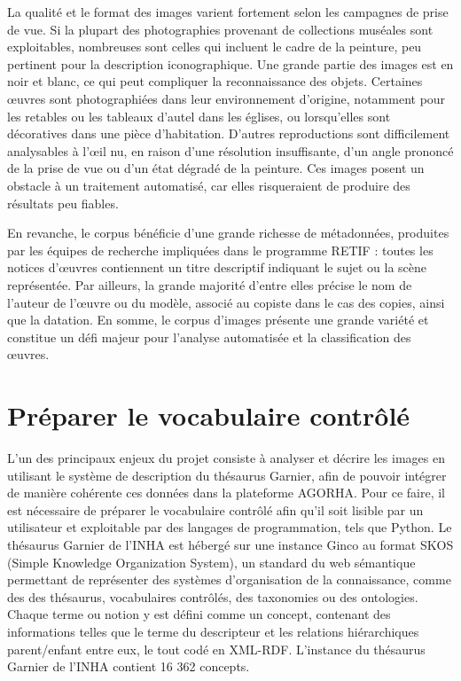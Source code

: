 La qualité et le format des images varient fortement selon les campagnes de prise de vue. Si la plupart des photographies provenant de collections muséales sont exploitables, nombreuses sont celles qui incluent le cadre de la peinture, peu pertinent pour la description iconographique. Une grande partie des images est en noir et blanc, ce qui peut compliquer la reconnaissance des objets. Certaines œuvres sont photographiées dans leur environnement d’origine, notamment pour les retables ou les tableaux d’autel dans les églises, ou lorsqu’elles sont décoratives dans une pièce d’habitation. D’autres reproductions sont difficilement analysables à l’œil nu, en raison d’une résolution insuffisante, d’un angle prononcé de la prise de vue ou d’un état dégradé de la peinture. Ces images posent un obstacle à un traitement automatisé, car elles risqueraient de produire des résultats peu fiables.

En revanche, le corpus bénéficie d’une grande richesse de métadonnées, produites par les équipes de recherche impliquées dans le programme RETIF : toutes les notices d’œuvres contiennent un titre descriptif indiquant le sujet ou la scène représentée. Par ailleurs, la grande majorité d’entre elles précise le nom de l’auteur de l'œuvre ou du modèle, associé au copiste dans le cas des copies, ainsi que la datation.
En somme, le corpus d’images présente une grande variété et constitue un défi majeur pour l’analyse automatisée et la classification des œuvres.

\section{Préparer le vocabulaire contrôlé}
L’un des principaux enjeux du projet consiste à analyser et décrire les images en utilisant le système de description du thésaurus Garnier, afin de pouvoir intégrer de manière cohérente ces données dans la plateforme AGORHA. Pour ce faire, il est nécessaire de préparer le vocabulaire contrôlé afin qu’il soit lisible par un utilisateur et exploitable par des langages de programmation, tels que Python. Le thésaurus Garnier de l’INHA est hébergé sur une instance Ginco au format SKOS (Simple Knowledge Organization System), un standard du web sémantique permettant de représenter des systèmes d’organisation de la connaissance, comme des des thésaurus, vocabulaires contrôlés, des taxonomies ou des ontologies. Chaque terme ou notion y est défini comme un concept, contenant des informations telles que le terme du descripteur et les relations hiérarchiques parent/enfant entre eux, le tout codé en XML-RDF. L’instance du thésaurus Garnier de l’INHA contient 16 362 concepts. 


